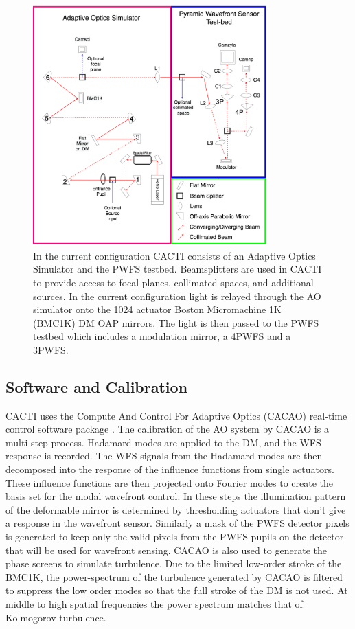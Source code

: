 \begin{figure}
    \centering
    \includegraphics[width=0.8\textwidth]{Chapter Materials/Chapter Five Materials/CACTI.png}
    \caption{In the current configuration CACTI consists of an Adaptive Optics Simulator and the PWFS testbed. Beamsplitters are used in CACTI to provide access to focal planes, collimated spaces, and additional sources. In the current configuration light is relayed through the AO simulator onto the 1024 actuator Boston Micromachine 1K (BMC1K) DM OAP mirrors. The light is then passed to the PWFS testbed which includes a modulation mirror, a 4PWFS and a 3PWFS.}
    \label{fig:CACTI}
\end{figure}

\subsection{Software and Calibration}

CACTI uses the Compute And Control For Adaptive Optics (CACAO) real-time control software package \citep{guyon2018compute}. The calibration of the AO system by CACAO is a multi-step process. Hadamard modes are applied to the DM, and the WFS response is recorded. The WFS signals from the Hadamard modes are then decomposed into the response of the influence functions from single actuators. These influence functions are then projected onto Fourier modes to create the basis set for the modal wavefront control. In these steps the illumination pattern of the deformable mirror is determined by thresholding actuators that don't give a response in the wavefront sensor. Similarly a mask of the PWFS detector pixels is generated to keep only the valid pixels from the PWFS pupils on the detector that will be used for wavefront sensing. CACAO is also used to generate the phase screens to simulate turbulence. Due to the limited low-order stroke of the BMC1K, the power-spectrum of the turbulence generated by CACAO is filtered to suppress the low order modes so that the full stroke of the DM is not used. At middle to high spatial frequencies the power spectrum matches that of Kolmogorov turbulence. 



